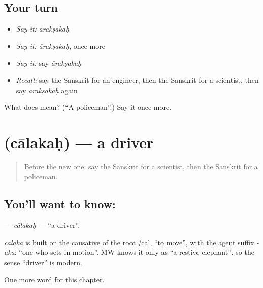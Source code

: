 \subsection*{Your turn}
\begin{itemize}
\raggedright
  \item \emph{Say it:} \emph{ārakṣakaḥ}
  \item \emph{Say it:} \emph{ārakṣakaḥ}, once more
  \item \emph{Say it:} say \emph{ārakṣakaḥ}
  \item \emph{Recall:} say the Sanskrit for an engineer, then the Sanskrit for a scientist, then say \emph{ārakṣakaḥ} again
\end{itemize}

\begin{tcolorbox}[breakable,colback=teal!4,colframe=teal!35!black,title={Before you move on}]
What does  mean? (\textquotedblleft{}A policeman\textquotedblright{}.) Say it once more.
\end{tcolorbox}
\section[\texorpdfstring{\sk{चालकः} (cālakaḥ)}{चालकः (cālakaḥ)}]{ (cālakaḥ) — a driver}

\label{lesson:SA-C238-calakah}



\begin{quote}
Before the new one: say the Sanskrit for a scientist, then the Sanskrit for a policeman.
\end{quote}

\subsection*{You'll want to know: }
\textbf{} — \emph{cālakaḥ} — \textquotedblleft{}a driver\textquotedblright{}.

\begin{cousinweb}
\emph{cālaka} is built on the causative of the root √cal, \textquotedblleft{}to move\textquotedblright{}, with the agent suffix \emph{-aka}: \textquotedblleft{}one who sets in motion\textquotedblright{}. MW knows it only as \textquotedblleft{}a restive elephant\textquotedblright{}, so the sense \textquotedblleft{}driver\textquotedblright{} is modern.
\end{cousinweb}

\begin{grammarlens}[title={What you've built}]
One more word for this chapter.
\end{grammarlens}

